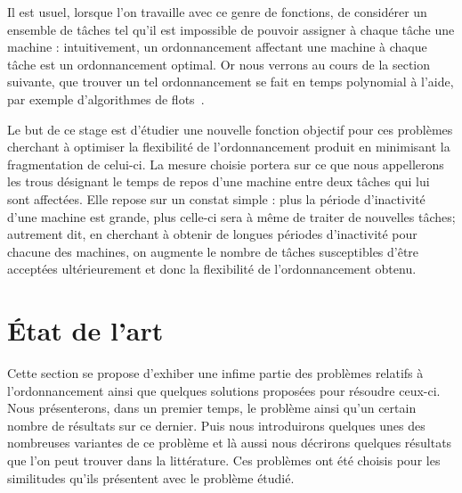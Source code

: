 \documentclass[a4paper,11pt]{report}
\begin{document}
Il est
usuel, lorsque l'on travaille avec ce genre de fonctions, de considérer un ensemble de tâches tel
qu'il est impossible de pouvoir assigner à chaque tâche une machine : intuitivement, un
ordonnancement affectant une machine à chaque tâche est un ordonnancement optimal. Or nous verrons
au cours de la section suivante, que trouver un tel ordonnancement se fait en temps polynomial à
l'aide, par exemple d'algorithmes de flots~\cite{arkin_scheduling_1987}.



Le but de ce stage est d'étudier une nouvelle fonction objectif pour ces problèmes cherchant à
optimiser la flexibilité de l'ordonnancement produit en minimisant la fragmentation de celui-ci. La
mesure choisie portera sur ce que nous appellerons les trous désignant le temps de repos d'une
machine entre deux tâches qui lui sont affectées. Elle repose sur un constat simple : plus la période
d'inactivité d'une machine est grande, plus celle-ci sera à même de traiter de nouvelles tâches;
autrement dit, en cherchant à obtenir de longues périodes d'inactivité pour chacune des machines, on
augmente le nombre de tâches susceptibles d'être acceptées ultérieurement et donc la flexibilité de
l'ordonnancement obtenu.


\newpage
\chapter{État de l'art}


Cette section se propose d'exhiber une infime partie des problèmes relatifs à l'ordonnancement
ainsi que quelques solutions proposées pour résoudre ceux-ci. Nous présenterons, dans un premier
temps, le problème \bisched{} ainsi qu'un certain nombre de résultats sur ce dernier. Puis nous
introduirons quelques unes des nombreuses variantes de ce problème et là aussi nous décrirons
quelques résultats que l'on peut trouver dans la littérature. Ces problèmes ont été choisis pour les
similitudes qu'ils présentent avec le problème étudié.
\end{document}
